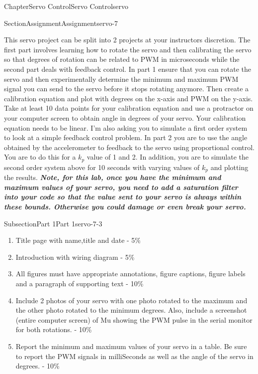 \documentclass[oneside,10pt,]{book}
\newcommand{\alert}[1]{\textbf{\textit{#1}}}
\numberwithin{equation}{section}
\begin{document}
\begin{chapterptx}{Chapter}{Servo Control}{}{Servo Control}{}{}{servo}
\begin{sectionptx}{Section}{Assignment}{}{Assignment}{}{}{servo-7}
\begin{introduction}{}
This servo project can be split into 2 projects at your instructors discretion. The first part involves learning how to rotate the servo and then calibrating the servo so that degrees of rotation can be related to PWM in microseconds while the second part deals with feedback control. In part 1 ensure that you can rotate the servo and then experimentally determine the minimum and maximum PWM signal you can send to the servo before it stops rotating anymore. Then create a calibration equation and plot with degrees on the x-axis and PWM on the y-axis. Take at least 10 data points for your calibration equation and use a protractor on your computer screen to obtain angle in degrees of your servo. Your calibration equation needs to be linear. I'm also asking you to simulate a first order system to look at a simple feedback control problem. In part 2 you are to use the angle obtained by the accelerometer to feedback to the servo using proportional control. You are to do this for a \(k_p\) value of 1 and 2. In addition, you are to simulate the second order system above for 10 seconds with varying values of \(k_p\) and plotting the results. \alert{Note, for this lab, once you have the minimum and maximum values of your servo, you need to add a saturation filter into your code so that the value sent to your servo is always within these bounds. Otherwise you could damage or even break your servo.}%
\end{introduction}%
%
%
\typeout{************************************************}
\typeout{************************************************}
%
\begin{subsectionptx}{Subsection}{Part 1}{}{Part 1}{}{}{servo-7-3}
%
\begin{enumerate}
\item{}Title page with name,title and date - 5\%%
\item{}Introduction with wiring diagram - 5\%%
\item{}All figures must have appropriate annotations, figure captions, figure labels and a paragraph of supporting text - 10\%%
\item{}Include 2 photos of your servo with one photo rotated to the maximum and the other photo rotated to the minimum degrees. Also, include a screenshot (entire computer screen) of Mu showing the PWM pulse in the serial monitor for both rotations. - 10\%%
\item{}Report the minimum and maximum values of your servo in a table. Be sure to report the PWM signals in milliSeconds as well as the angle of the servo in degrees. - 10\%%

\end{enumerate}
\end{subsectionptx}
\end{sectionptx}
\end{chapterptx}
\end{document}
